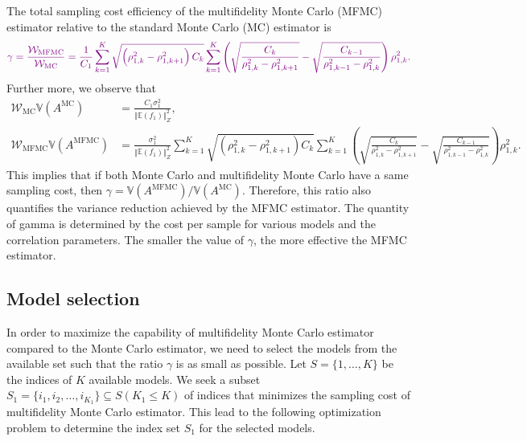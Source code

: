 \documentclass[final,3p,times,11pt]{elsarticle}
\newcommand{\JLcolor}[1]{{\textcolor{violet}{#1}}} %
\begin{document}
The total sampling cost efficiency of the multifidelity Monte Carlo (MFMC) estimator relative to the standard Monte Carlo (MC) estimator is
\[
\JLcolor{\gamma = \frac{\mathcal{W}_\text{MFMC}}{\mathcal{W}_\text{MC}} = \frac{1}{C_1} \sum_{k=1}^K\sqrt{\left(\rho_{1,k}^2 - \rho_{1,k+1}^2\right)C_k}\sum_{k=1}^K\left(\sqrt{\frac{C_k}{\rho_{1,k}^2 - \rho_{1,k+1}^2}} - \sqrt{\frac{C_{k-1}}{\rho_{1,{k-1}}^2 - \rho_{1,k}^2}}\right)\rho_{1,k}^2.}
\]
Further more, we observe that
\begin{align*}
    \mathcal{W}_\text{MC}\mathbb{V}\left(A^{\text{MC}}\right) &=\frac{C_1\sigma_1^2}{\left\Vert\mathbb{E}(f_1) \right\Vert_{Z}^2},\\
 \mathcal{W}_\text{MFMC}\mathbb{V}\left(A^{\text{MFMC}}\right) &=  \frac{\sigma_1^2}{\left\Vert\mathbb{E}(f_1) \right\Vert_{Z}^2}\sum_{k=1}^K\sqrt{\left(\rho_{1,k}^2 - \rho_{1,k+1}^2\right)C_k}\sum_{k=1}^K\left(\sqrt{\frac{C_k}{\rho_{1,k}^2 - \rho_{1,k+1}^2}} - \sqrt{\frac{C_{k-1}}{\rho_{1,{k-1}}^2 - \rho_{1,k}^2}}\right)\rho_{1,k}^2.
\end{align*}
This implies that if both Monte Carlo and multifidelity Monte Carlo have  a same sampling cost, then $\gamma=  \mathbb{V}\left(A^{\text{MFMC}}\right)/\mathbb{V}\left(A^{\text{MC}}\right)$. Therefore, this ratio also quantifies the variance reduction achieved by the MFMC estimator. The quantity of gamma is determined by the cost per sample for various models and the correlation parameters. The smaller the value of $\gamma$, the more effective the MFMC estimator.



\subsection{Model selection}
In order to maximize the capability of multifidelity Monte Carlo estimator  compared to the Monte Carlo estimator, we need to select the models from the available set such that the ratio $\gamma$ is as small as possible. Let $S=\{1, \ldots, K\}$ be the indices of $K$ available models. We seek a subset $S_1=\{i_1,i_2, \ldots,i_{K_1}\}\subseteq S (K_1\le K)$ of indices that minimizes the sampling cost of multifidelity Monte Carlo estimator. This lead to the following optimization problem to determine the index set $S_1$ for the selected models.
\end{document}
